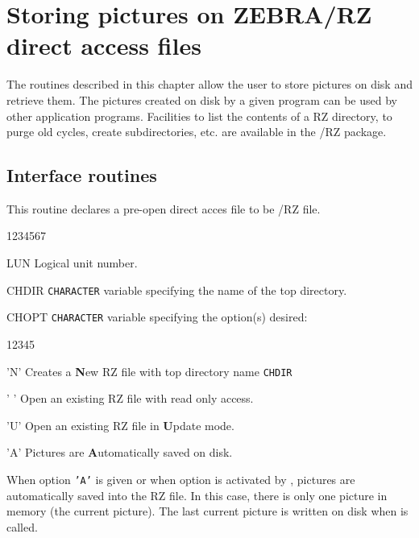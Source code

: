 
\chapter{Storing pictures on ZEBRA/RZ direct access files}

The routines described in this chapter allow the \HIGZ{} user to store pictures
on disk and retrieve them. The pictures created on disk by a given \HIGZ{} 
program can be used by other \HIGZ{} application programs. Facilities to list 
the contents of a RZ directory, to purge old cycles, create subdirectories, 
etc. are available in the \ZEBRA/RZ package.

\section{Interface routines}
\Action
This routine declares a pre-open direct acces file to be \ZEBRA/RZ file.
\Pdesc
\begin{DLtt}{1234567}
\item[LUN]   Logical unit number.
\item[CHDIR] {\tt CHARACTER} variable specifying the name of the top directory.
\item[CHOPT] {\tt CHARACTER} variable specifying the option(s) desired:
\begin{DLtt}{12345}
   \item['N'] Creates a {\bf N}ew RZ file with top directory name {\tt CHDIR}
   \item[' '] Open an existing RZ file with read only access.
   \item['U'] Open an existing RZ file in {\bf U}pdate mode.
   \item['A'] Pictures are {\bf A}utomatically saved on disk.
\end{DLtt}
\end{DLtt}
When option {\tt'A'} is given or when option  is activated by 
, pictures are automatically saved into the RZ file. In this case,
there is only one picture in memory (the current picture). The last current 
picture is written on disk when  is called.
 


